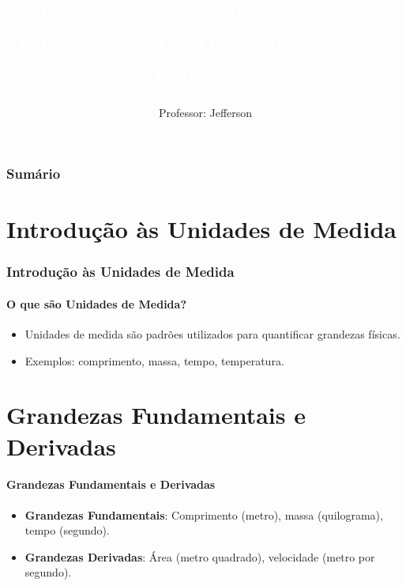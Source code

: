 \documentclass[12pt]{beamer}
\title{\textcolor{white}{Unidades de Medida, Sistema Internacional (SI) e Conversão de Unidades}}
\author{Professor: Jefferson}
\date{}
\begin{document}
\frame{\titlepage}

\begin{frame}
    \frametitle{Sumário}
    \tableofcontents
\end{frame}

\begin{frame}
    \section{Introdução às Unidades de Medida}
    \frametitle{Introdução às Unidades de Medida}
    \framesubtitle{O que são Unidades de Medida?}
    \begin{itemize}
        \item Unidades de medida são padrões utilizados para quantificar grandezas físicas.
        \item Exemplos: comprimento, massa, tempo, temperatura.
    \end{itemize}

    \section{Grandezas Fundamentais e Derivadas}
    \framesubtitle{Grandezas Fundamentais e Derivadas}

    \begin{itemize}
        \item \textbf{Grandezas Fundamentais}: Comprimento (metro), massa (quilograma), tempo (segundo).
        \item \textbf{Grandezas Derivadas}: Área (metro quadrado), velocidade (metro por segundo).
    \end{itemize}
\end{frame}
\end{document}
